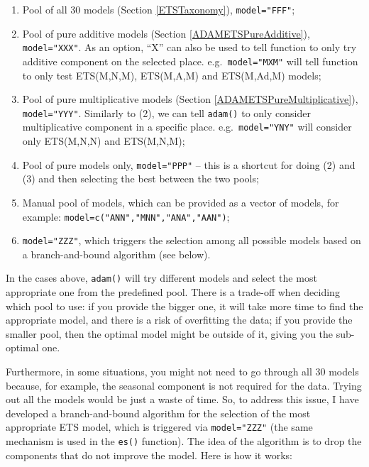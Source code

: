 \documentclass[
]{book}
\providecommand{\tightlist}{%
  \setlength{\itemsep}{0pt}\setlength{\parskip}{0pt}}
\theoremstyle{definition}
\theoremstyle{definition}
\theoremstyle{definition}
\theoremstyle{definition}
\theoremstyle{remark}
\begin{document}
\begin{enumerate}
\def\labelenumi{\arabic{enumi}.}
\tightlist
\item
  Pool of all 30 models (Section \ref{ETSTaxonomy}), \texttt{model="FFF"};
\item
  Pool of pure additive models (Section \ref{ADAMETSPureAdditive}), \texttt{model="XXX"}. As an option, ``X'' can also be used to tell function to only try additive component on the selected place. e.g.~\texttt{model="MXM"} will tell function to only test ETS(M,N,M), ETS(M,A,M) and ETS(M,Ad,M) models;
\item
  Pool of pure multiplicative models (Section \ref{ADAMETSPureMultiplicative}), \texttt{model="YYY"}. Similarly to (2), we can tell \texttt{adam()} to only consider multiplicative component in a specific place. e.g.~\texttt{model="YNY"} will consider only ETS(M,N,N) and ETS(M,N,M);
\item
  Pool of pure models only, \texttt{model="PPP"} -- this is a shortcut for doing (2) and (3) and then selecting the best between the two pools;
\item
  Manual pool of models, which can be provided as a vector of models, for example: \texttt{model=c("ANN","MNN","ANA","AAN")};
\item
  \texttt{model="ZZZ"}, which triggers the selection among all possible models based on a branch-and-bound algorithm (see below).
\end{enumerate}

In the cases above, \texttt{adam()} will try different models and select the most appropriate one from the predefined pool. There is a trade-off when deciding which pool to use: if you provide the bigger one, it will take more time to find the appropriate model, and there is a risk of overfitting the data; if you provide the smaller pool, then the optimal model might be outside of it, giving you the sub-optimal one.

Furthermore, in some situations, you might not need to go through all 30 models because, for example, the seasonal component is not required for the data. Trying out all the models would be just a waste of time. So, to address this issue, I have developed a branch-and-bound algorithm for the selection of the most appropriate ETS model, which is triggered via \texttt{model="ZZZ"} (the same mechanism is used in the \texttt{es()} function). The idea of the algorithm is to drop the components that do not improve the model. Here is how it works:
\end{document}
